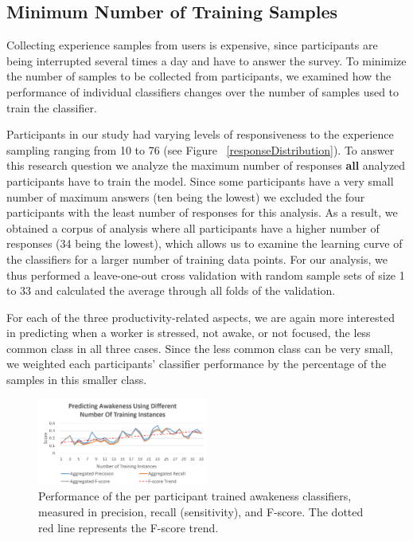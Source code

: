 
\subsection{Minimum Number of Training Samples}\label{secLearningCurve}
Collecting experience samples from users is expensive, since participants 
are being interrupted several times a day and have to answer the survey. 
To minimize the number of samples to be collected from participants, we 
examined how the performance of individual classifiers changes over the 
number of samples used to train the classifier.

Participants in our study had varying levels of responsiveness to the 
experience sampling ranging from 10 to 76 (see Figure~
\ref{responseDistribution}).
To answer this research question we analyze the maximum number of responses \textbf{all} analyzed participants have to train the model. Since some participants have a very small number of maximum answers (ten being the lowest) we excluded the four participants with the least number of responses for this analysis.
As a result, we obtained a corpus of analysis where all participants have a 
higher number of responses (34 being the lowest), which allows us to examine 
the learning curve of the classifiers for a larger number of training data points. For our 
analysis, we thus performed a leave-one-out cross validation with random 
sample sets of size 1 to 33 and calculated the average through all folds of 
the validation.

For each of the three productivity-related aspects, we are again more 
interested in predicting when a worker is stressed, not awake, or not 
focused, the less common class in all three cases. Since the less common 
class can be very small, we weighted each participants' classifier 
performance by the percentage of the samples in this smaller class.

\begin{figure}
  \centering
          \includegraphics[width=0.5\textwidth]{20180912AwakenessLC2.png}
  \caption{Performance of the per participant trained awakeness classifiers, measured in precision, recall (sensitivity), and F-score. The dotted red line represents the F-score trend.}\label{fig:learningCurveInd}
\end{figure}

